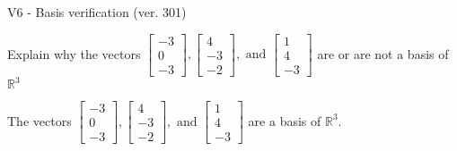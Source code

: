 \begin{exercise}
  \begin{exerciseTitle}V6 - Basis verification (ver. 301)\end{exerciseTitle}
  \begin{exerciseStatement}
    Explain why the vectors \(\left[\begin{array}{r}
-3 \\
0 \\
-3
\end{array}\right] , \left[\begin{array}{r}
4 \\
-3 \\
-2
\end{array}\right] , \text{ and } \left[\begin{array}{r}
1 \\
4 \\
-3
\end{array}\right]\) are or are not a basis of \(\mathbb{R}^3\)	


  \end{exerciseStatement}
  \begin{exerciseAnswer}
   The vectors \(\left[\begin{array}{r}
-3 \\
0 \\
-3
\end{array}\right] , \left[\begin{array}{r}
4 \\
-3 \\
-2
\end{array}\right] , \text{ and } \left[\begin{array}{r}
1 \\
4 \\
-3
\end{array}\right]\) 
  	 are  a basis of \(\mathbb{R}^3\).
  


  \end{exerciseAnswer}
\end{exercise}